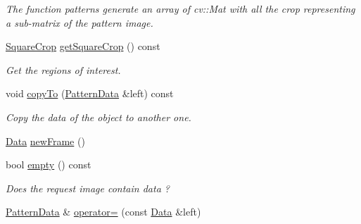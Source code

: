 \begin{DoxyCompactItemize}
\begin{DoxyCompactList}\small\item\em The function patterns generate an array of cv\+::\+Mat with all the crop representing a sub-\/matrix of the pattern image. \end{DoxyCompactList}\item 
\hyperlink{classfilter_1_1data_1_1_square_crop}{Square\+Crop} \hyperlink{classfilter_1_1data_1_1_pattern_data_ad51b9505b78d94b5fac9e4afa83c087e}{get\+Square\+Crop} () const
\begin{DoxyCompactList}\small\item\em Get the regions of interest. \end{DoxyCompactList}\item 
void \hyperlink{classfilter_1_1data_1_1_pattern_data_ac31dcdd1b592d5f733f2d931c74f0cd8}{copy\+To} (\hyperlink{classfilter_1_1data_1_1_pattern_data}{Pattern\+Data} \&left) const
\begin{DoxyCompactList}\small\item\em Copy the data of the object to another one. \end{DoxyCompactList}\item 
\hyperlink{classfilter_1_1data_1_1_data}{Data} \hyperlink{classfilter_1_1data_1_1_pattern_data_ae71825f7e967464209788bf406e0abd4}{new\+Frame} ()
\item 
bool \hyperlink{classfilter_1_1data_1_1_pattern_data_a333d7ffa45e6a041e10e2f957c91dbbf}{empty} () const
\begin{DoxyCompactList}\small\item\em Does the request image contain data ? \end{DoxyCompactList}\item 
\hyperlink{classfilter_1_1data_1_1_pattern_data}{Pattern\+Data} \& \hyperlink{classfilter_1_1data_1_1_pattern_data_a1a32234b0caa236a546dea6ba5ba028f}{operator=} (const \hyperlink{classfilter_1_1data_1_1_data}{Data} \&left)
\end{DoxyCompactItemize}
